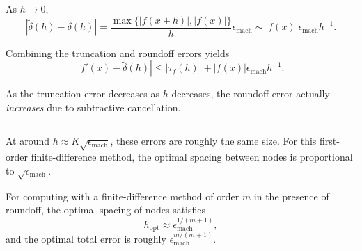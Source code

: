 \documentclass[
]{article}
\begin{document}
As \(h \rightarrow 0\),
\[|\tilde{\delta}(h) - \delta(h)| = \frac{\max\{|f(x+h)|,|f(x)|\}}{h} \epsilon_{\text{mach}} \sim |f(x)| \epsilon_{\text{mach}} h^{-1}.\]

Combining the truncation and roundoff errors yields
\[|f'(x) - \tilde{\delta}(h)| \le |\tau_f(h)| + |f(x)| \epsilon_{\text{mach}} h^{-1}.\]

As the truncation error decreases as \(h\) decreases, the roundoff error
actually \emph{increases} due to subtractive cancellation.

\begin{center}\rule{0.5\linewidth}{0.5pt}\end{center}

At around \(h \approx K \sqrt{\epsilon_{\text{mach}}}\), these errors
are roughly the same size. For this first-order finite-difference
method, the optimal spacing between nodes is proportional to
\(\sqrt{\epsilon_{\text{mach}}}\).

\begin{tcolorbox}[enhanced jigsaw, left=2mm, arc=.35mm, leftrule=.75mm, colbacktitle=quarto-callout-warning-color!10!white, coltitle=black, toptitle=1mm, bottomtitle=1mm, colback=white, colframe=quarto-callout-warning-color-frame, opacityback=0, breakable, titlerule=0mm, title={Fact:}, rightrule=.15mm, bottomrule=.15mm, toprule=.15mm, opacitybacktitle=0.6]

For computing with a finite-difference method of order \(m\) in the
presence of roundoff, the optimal spacing of nodes satisfies
\[h_{\text{opt}} \approx \epsilon_{\text{mach}}^{1/(m+1)},\] and the
optimal total error is roughly \(\epsilon_{\text{mach}}^{m/(m+1)}\).

\end{tcolorbox}
\end{document}
